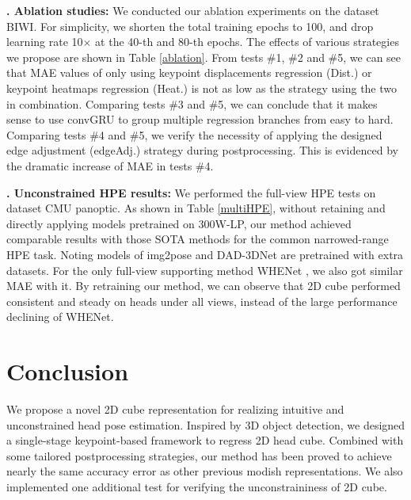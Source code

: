 \documentclass{article}
\begin{document}
{\bf {}. Ablation studies:}
We conducted our ablation experiments on the dataset BIWI. For simplicity, we shorten the total training epochs to 100, and drop learning rate 10$\times$ at the 40-th and 80-th epochs. The effects of various strategies we propose are shown in Table \ref{ablation}. From tests \#1, \#2 and \#5, we can see that MAE values of only using keypoint displacements regression (Dist.) or keypoint heatmaps regression (Heat.) is not as low as the strategy using the two in combination. Comparing tests \#3 and \#5, we can conclude that it makes sense to use convGRU to group multiple regression branches from easy to hard. Comparing tests \#4 and \#5, we verify the necessity of applying the designed edge adjustment (edgeAdj.) strategy during postprocessing. This is evidenced by the dramatic increase of MAE in tests \#4.

{\bf {}. Unconstrained HPE results:}
We performed the full-view HPE tests on dataset CMU panoptic. As shown in Table \ref{multiHPE}, without retaining and directly applying models pretrained on 300W-LP, our method achieved comparable results with those SOTA methods for the common narrowed-range HPE task. Noting models of img2pose \cite{albiero2021img2pose} and DAD-3DNet \cite{martyniuk2022dad} are pretrained with extra datasets. For the only full-view supporting method WHENet \cite{zhou2020whenet}, we also got similar MAE with it. By retraining our method, we can observe that 2D cube performed consistent and steady on heads under all views, instead of the large performance declining of WHENet.


\section{Conclusion}
We propose a novel 2D cube representation for realizing intuitive and unconstrained head pose estimation. Inspired by 3D object detection, we designed a single-stage keypoint-based framework to regress 2D head cube. Combined with some tailored postprocessing strategies, our method has been proved to achieve nearly the same accuracy error as other previous modish representations. We also implemented one additional test for verifying the unconstraininess of 2D cube. 



\vfill\pagebreak


\end{document}
